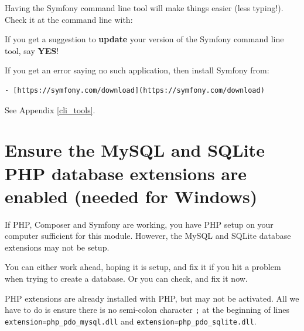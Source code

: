 \documentclass[a4paperpaper,openright]{book}
\newenvironment{Shaded}{}{}
\newcommand{\ExtensionTok}[1]{#1}
\newcommand{\NormalTok}[1]{#1}
\begin{document}
Having the Symfony command line tool will make things easier (less
typing!). Check it at the command line with:

\begin{Shaded}
\end{Shaded}

If you get a suggestion to \textbf{update} your version of the Symfony
command line tool, say \textbf{YES}!

If you get an error saying no such application, then install Symfony
from:

\begin{verbatim}
- [https://symfony.com/download](https://symfony.com/download) 
\end{verbatim}

See Appendix \ref{cli_tools}.

\hypertarget{ensure-the-mysql-and-sqlite-php-database-extensions-are-enabled-needed-for-windows}{%
\section{Ensure the MySQL and SQLite PHP database extensions are enabled
(needed for
Windows)}\label{ensure-the-mysql-and-sqlite-php-database-extensions-are-enabled-needed-for-windows}}

If PHP, Composer and Symfony are working, you have PHP setup on your
computer sufficient for this module. However, the MySQL and SQLite
database extensions may not be setup.

You can either work ahead, hoping it is setup, and fix it if you hit a
problem when trying to create a database. Or you can check, and fix it
now.

PHP extensions are already installed with PHP, but may not be activated.
All we have to do is ensure there is no semi-colon character \texttt{;}
at the beginning of lines \texttt{extension=php\_pdo\_mysql.dll} and
\texttt{extension=php\_pdo\_sqlite.dll}.
\end{document}
